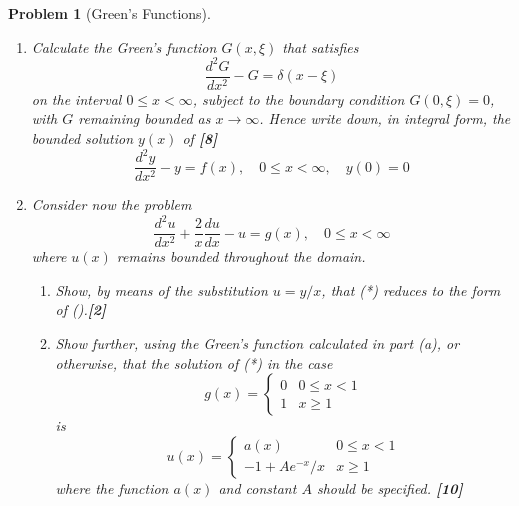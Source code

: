 \documentclass[a4paper]{article}
\theoremstyle{new}
\newtheorem{qns}{Problem}[section]
\begin{document}
\begin{qns}[Green's Functions]\leavevmode
\begin{enumerate}[label=(\alph*)]
\item Calculate the Green’s function $G(x,\xi)$ that satisfies
$$\frac{d^2G}{dx^2}-G=\delta(x-\xi)$$
on the interval $0\leq x<\infty$, subject to the boundary condition $G(0, \xi) = 0$, with $G$ remaining bounded as $x\rightarrow\infty$. Hence write down, in integral form, the bounded solution $y(x)$ of
\hfill\textbf{[8]}
\begin{equation}
    \frac{d^2y}{dx^2}-y=f(x),\quad0\leq x<\infty,\quad y(0)=0\tag{\dag}
\end{equation}
\item Consider now the problem
\begin{equation}
    \frac{d^2u}{dx^2}+\frac{2}{x}\frac{du}{dx}-u=g(x),\quad0\leq x<\infty\tag{*}
\end{equation}
where $u(x)$ remains bounded throughout the domain.
\begin{enumerate}[label=(\roman*)]
\item Show, by means of the substitution $u=y/x$, that (*) reduces to the form of (\dag).\hfill\textbf{[2]}
\item Show further, using the Green’s function calculated in part (a), or otherwise, that the solution of (*) in the case
$$g(x)=
\left\{
        \begin{array}{ll}
      0 & 0\leq x<1 \\
      1 & x\geq1
        \end{array}
    \right.$$
is
$$u(x)=
\left\{
        \begin{array}{ll}
      a(x) & 0\leq x<1 \\
      -1+Ae^{-x}/x & x\geq1
        \end{array}
    \right.$$
where the function $a(x)$ and constant $A$ should be specified. \hfill\textbf{[10]}
\end{enumerate}
\end{enumerate}
\end{qns}
\end{document}
